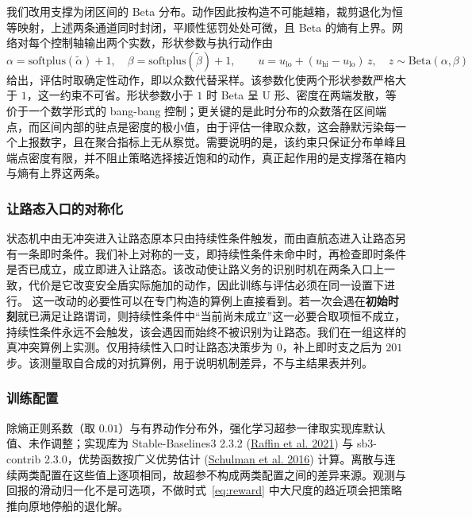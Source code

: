 \documentclass[12pt,letterpaper]{article}
\newcommand{\citl}[2]{(\hyperlink{ref:#1}{#2})}
\begin{document}
我们改用支撑为闭区间的 Beta 分布。动作因此按构造不可能越箱，裁剪退化为恒等映射，上述两条通道同时封闭，平顺性惩罚处处可微，且 Beta 的熵有上界。网络对每个控制轴输出两个实数，形状参数与执行动作由
\begin{equation}
 \alpha=\mathrm{softplus}(\tilde\alpha)+1,\quad \beta=\mathrm{softplus}(\tilde\beta)+1,\qquad
 u=u_{\mathrm{lo}}+(u_{\mathrm{hi}}-u_{\mathrm{lo}})\,z,\quad z\sim\mathrm{Beta}(\alpha,\beta)
 \label{eq:beta}
\end{equation}
给出，评估时取确定性动作，即以众数代替采样。该参数化使两个形状参数严格大于 $1$，这一约束不可省。形状参数小于 $1$ 时 Beta 呈 U 形、密度在两端发散，等价于一个数学形式的 bang-bang 控制；更关键的是此时分布的众数落在区间端点，而区间内部的驻点是密度的极小值，由于评估一律取众数，这会静默污染每一个上报数字，且在聚合指标上无从察觉。需要说明的是，该约束只保证分布单峰且端点密度有限，并不阻止策略选择接近饱和的动作，真正起作用的是支撑落在箱内与熵有上界这两条。

\subsubsection{让路态入口的对称化}
\label{sec:sym}

状态机中由无冲突进入让路态原本只由持续性条件触发，而由直航态进入让路态另有一条即时条件。我们补上对称的一支，即持续性条件未命中时，再检查即时条件是否已成立，成立即进入让路态。该改动使让路义务的识别时机在两条入口上一致，代价是它改变安全盾实际施加的动作，因此训练与评估必须在同一设置下进行。 这一改动的必要性可以在专门构造的算例上直接看到。若一次会遇在\textbf{初始时刻}就已满足让路谓词，则持续性条件中“当前尚未成立”这一必要合取项恒不成立，持续性条件永远不会触发，该会遇因而始终不被识别为让路态。我们在一组这样的真冲突算例上实测。仅用持续性入口时让路态决策步为 $0$，补上即时支之后为 $201$ 步。该测量取自合成的对抗算例，用于说明机制差异，不与主结果表并列。

\subsubsection{训练配置}
\label{sec:train}

除熵正则系数（取 $0.01$）与有界动作分布外，强化学习超参一律取实现库默认值、未作调整；实现库为 Stable-Baselines3 2.3.2 \citl{raffin2021}{Raffin et al. 2021} 与 sb3-contrib 2.3.0，优势函数按广义优势估计 \citl{schulman2016}{Schulman et al. 2016} 计算。离散与连续两类配置在这些值上逐项相同，故超参不构成两类配置之间的差异来源。观测与回报的滑动归一化不是可选项，不做时式~\eqref{eq:reward} 中大尺度的趋近项会把策略推向原地停船的退化解。
\end{document}
